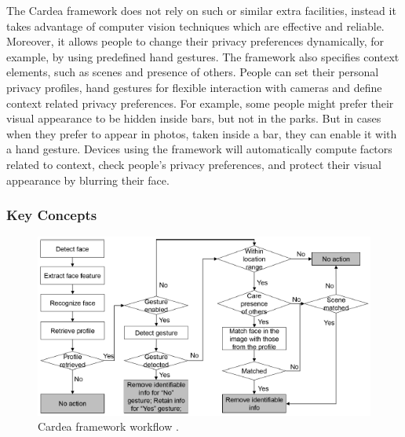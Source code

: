\documentclass[conference]{IEEEtran}
\begin{document}
The Cardea framework \cite{shu2016cardea} does not rely on such or similar extra facilities, instead it takes advantage of computer vision techniques which are effective and reliable. Moreover, it allows people to change their privacy preferences dynamically, for example, by using predefined hand gestures. The framework also specifies context elements, such as scenes and presence of others. People can set their personal privacy profiles, hand gestures for flexible interaction with cameras and define context related privacy preferences. For example, some people might prefer their visual appearance to be hidden inside bars, but not in the parks. But in cases when they prefer to appear in photos, taken inside a bar, they can enable it with a hand gesture. Devices using the framework will automatically compute factors related to context, check people's privacy preferences, and protect their visual appearance by blurring their face.

\subsubsection{Key Concepts}
\begin{figure}[t]
\centerline{\includegraphics[width=.5\textwidth]{img/cardea_workflow.png}}
\caption{Cardea framework workflow \cite{shu2016cardea}.}
\label{fig:cardea}
\end{figure}
\end{document}
